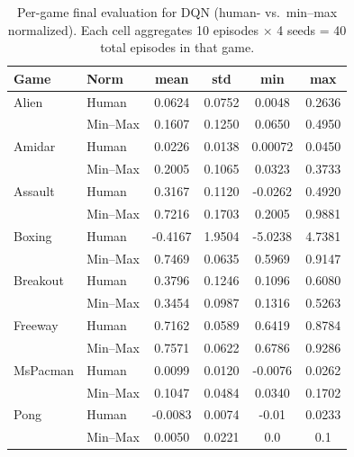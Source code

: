 \begin{table}
	\caption{Per-game final evaluation for DQN (human- vs.\ min--max normalized). 
		Each cell aggregates 10 episodes $\times$ 4 seeds = 40 total episodes in that game.}
	\label{tab:dqn_eval_gamewise}
	\centering
	\begin{tabular}{llcccc}
		\toprule
		\textbf{Game} & \textbf{Norm} & \textbf{mean} & \textbf{std} & \textbf{min} & \textbf{max}\\
		\midrule
		Alien    & Human   & 0.0624 & 0.0752 & 0.0048 & 0.2636 \\
		    & Min--Max & 0.1607 & 0.1250 & 0.0650 & 0.4950 \\
		\cmidrule{1-6}
		Amidar   & Human   & 0.0226 & 0.0138 & 0.00072 & 0.0450 \\
		   & Min--Max & 0.2005 & 0.1065 & 0.0323 & 0.3733 \\
		\cmidrule{1-6}
		Assault  & Human   & 0.3167 & 0.1120 & -0.0262 & 0.4920 \\
		  & Min--Max & 0.7216 & 0.1703 & 0.2005 & 0.9881 \\
		\cmidrule{1-6}
		Boxing   & Human   & -0.4167 & 1.9504 & -5.0238 & 4.7381 \\
		   & Min--Max & 0.7469 & 0.0635 & 0.5969 & 0.9147 \\
		\cmidrule{1-6}
		Breakout & Human   & 0.3796 & 0.1246 & 0.1096 & 0.6080 \\
		 & Min--Max & 0.3454 & 0.0987 & 0.1316 & 0.5263 \\
		\cmidrule{1-6}
		Freeway  & Human   & 0.7162 & 0.0589 & 0.6419 & 0.8784 \\
		  & Min--Max & 0.7571 & 0.0622 & 0.6786 & 0.9286 \\
		\cmidrule{1-6}
		MsPacman & Human   & 0.0099 & 0.0120 & -0.0076 & 0.0262 \\
		 & Min--Max & 0.1047 & 0.0484 & 0.0340 & 0.1702 \\
		\cmidrule{1-6}
		Pong     & Human   & -0.0083 & 0.0074 & -0.01 & 0.0233 \\
		     & Min--Max & 0.0050 & 0.0221 & 0.0 & 0.1 \\
		\bottomrule
	\end{tabular}
\end{table}


